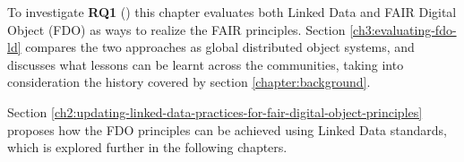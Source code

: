 
To investigate \textbf{RQ1} () this chapter evaluates both Linked Data and FAIR Digital Object (FDO) as ways to realize the FAIR principles. Section \ref{ch3:evaluating-fdo-ld} compares the two approaches as global distributed object systems, and discusses what lessons can be learnt across the communities, taking into consideration the history covered by section \ref{chapter:background}.

Section \ref{ch2:updating-linked-data-practices-for-fair-digital-object-principles} proposes how the FDO principles can be achieved using Linked Data standards, which is explored further in the following chapters.
